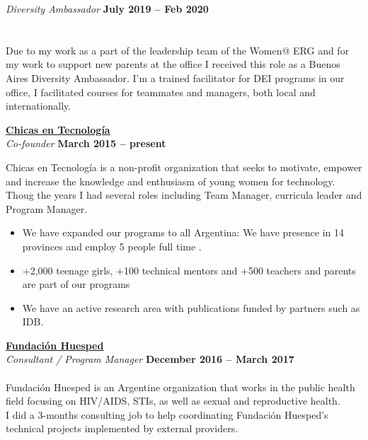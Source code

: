 \documentclass[margin,line]{resume}
\begin{document}
\begin{resume}
\textsl{Diversity Ambassador} 
 \hfill \textbf{July 2019 -- Feb 2020}\vspace{-3mm}\\\vspace{-1mm}
\hfill \vspace{-3mm}\\\vspace{-1mm}
\\
Due to my work as a part of the leadership team of the Women@ ERG and for my work to support new parents at the office I received this role as a Buenos Aires Diversity Ambassador.
I'm a trained facilitator for DEI programs in our office, I facilitated  courses for teammates and managers, both local and internationally.
 


\textbf{\href{http://www.chicasentecnologia.org/}{Chicas en Tecnolog\'ia}}\\\vspace{1mm}
\textsl{Co-founder } \hfill \textbf{March 2015 -- present}\vspace{-3mm}\\\vspace{-1mm}

Chicas en Tecnolog\'ia is a non-profit organization that seeks to motivate, empower and increase the knowledge and enthusiasm of young women for technology.
Thoug the years I had several roles including Team Manager, curricula leader and Program Manager.

\begin{itemize}

\item We have expanded our programs to all Argentina: We have presence in 14 provinces and employ 5 people full time .

\item  +2,000 teenage girls,  +100 technical mentors and +500 teachers and parents are part of our programs

\item We have an active research area with publications funded by partners such as IDB.

\end{itemize}

\vspace{-5mm}
\textbf{\href{https://www.huesped.org.ar/}{Fundaci\'on Huesped}}\\\vspace{1mm}
\textsl{Consultant / Program Manager} \hfill \textbf{December 2016 -- March 2017}\vspace{-3mm}\\\vspace{-1mm}
\\
Fundaci\'on Huesped is an Argentine organization that works in the public health field focusing on HIV/AIDS, STIs, as well as sexual and reproductive health.
\\
I did a 3-months consulting job to help coordinating Fundaci\'on Huesped's technical projects implemented by external providers.



\end{resume}
\end{document}
